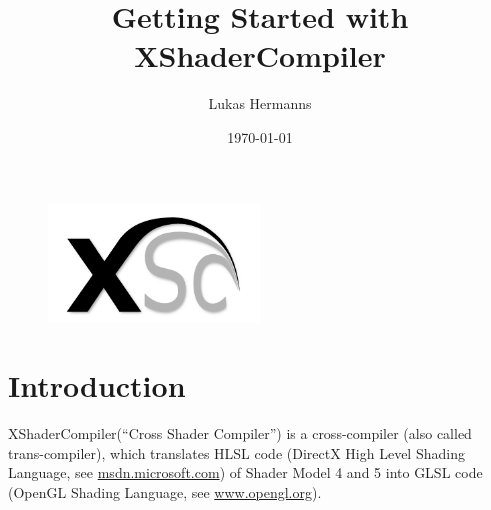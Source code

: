 \documentclass{article}
\title{Getting Started with XShaderCompiler}
\author{Lukas Hermanns}
\date{\today}
\begin{document}

\def\XSC{\textcolor{darkBlueColor}{XShaderCompiler}\xspace}


\maketitle

\begin{figure}[ht]
	\centering
	\includegraphics[width=0.5\textwidth]{images/Xsc_Logo.pdf}
\end{figure}

\newpage



\tableofcontents

\newpage



\section{Introduction}

\XSC (``Cross Shader Compiler'') is a cross-compiler (also called trans-compiler),
which translates HLSL code (DirectX High Level Shading Language,
see \href{https://msdn.microsoft.com/en-us/library/windows/desktop/bb509561(v=vs.85).aspx}{msdn.microsoft.com}) 
of Shader Model 4 and 5 into GLSL code (OpenGL Shading Language,
see \href{https://www.opengl.org/wiki/OpenGL_Shading_Language}{www.opengl.org}).
\end{document}
